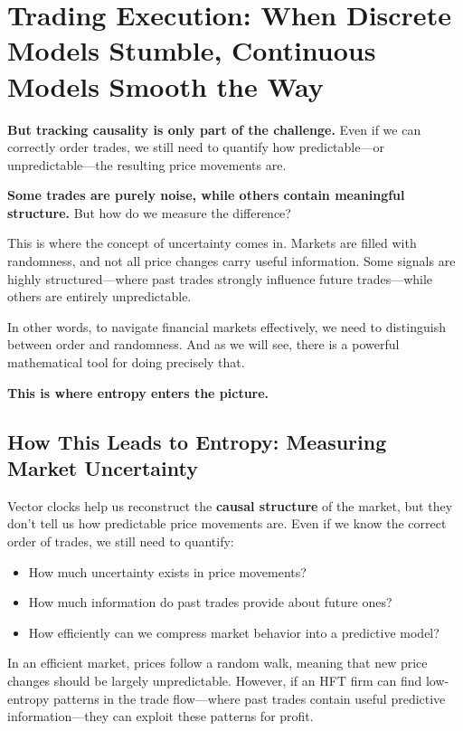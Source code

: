 \section{Trading Execution: When Discrete Models Stumble, Continuous Models Smooth the Way}

\textbf{But tracking causality is only part of the challenge.} Even if we can correctly order trades, we still need to quantify how predictable—or unpredictable—the resulting price movements are.

\textbf{Some trades are purely noise, while others contain meaningful structure.} But how do we measure the difference?  

This is where the concept of uncertainty comes in. Markets are filled with randomness, and not all price changes carry useful information. Some signals are highly structured—where past trades strongly influence future trades—while others are entirely unpredictable.

In other words, to navigate financial markets effectively, we need to distinguish between order and randomness. And as we will see, there is a powerful mathematical tool for doing precisely that.  

\textbf{This is where entropy enters the picture.}  

\subsection{How This Leads to Entropy: Measuring Market Uncertainty}

Vector clocks help us reconstruct the \textbf{causal structure} of the market, but they don’t tell us how predictable price movements are. Even if we know the correct order of trades, we still need to quantify:

\begin{itemize}
    \item How much uncertainty exists in price movements?
    \item How much information do past trades provide about future ones?
    \item How efficiently can we compress market behavior into a predictive model?
\end{itemize}

In an efficient market, prices follow a random walk, meaning that new price changes should be largely unpredictable. However, if an HFT firm can find low-entropy patterns in the trade flow—where past trades contain useful predictive information—they can exploit these patterns for profit.

